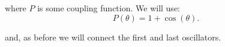 \documentclass{article}
\begin{document}
where $P$ is some coupling function. We will use:
\begin{equation} \label{eq_adlers}
    P(\theta) = 1 + \cos(\theta).
\end{equation}

and, as before we will connect the first and last oscillators.





\begin{figure} [h]
    \centerline{}
    \caption{}
    \label{fig_nexccoupled}
\end{figure}
\end{document}
